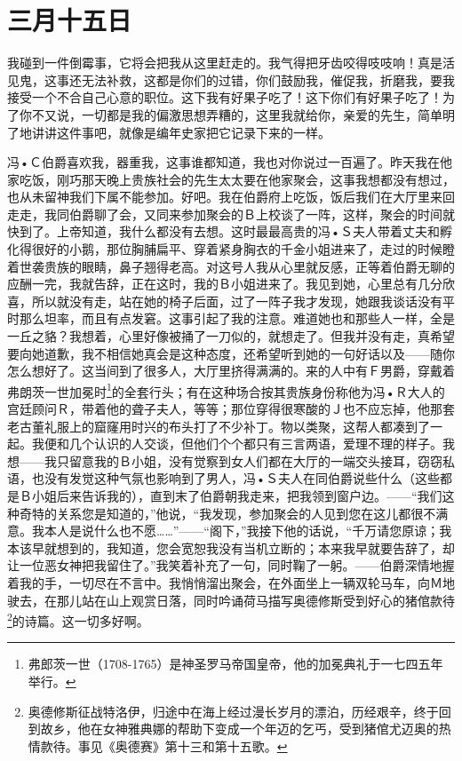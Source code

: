 \documentclass[12pt,oneside]{book}
\begin{document}
\chapter{三月十五日}
\label{sec-3-9}
我碰到一件倒霉事，它将会把我从这里赶走的。我气得把牙齿咬得吱吱响！真是活见鬼，这事还无法补救，这都是你们的过错，你们鼓励我，催促我，折磨我，要我接受一个不合自己心意的职位。这下我有好果子吃了！这下你们有好果子吃了！为了你不又说，一切都是我的偏激思想弄糟的，这里我就给你，亲爱的先生，简单明了地讲讲这件事吧，就像是编年史家把它记录下来的一样。

冯•Ｃ伯爵喜欢我，器重我，这事谁都知道，我也对你说过一百遍了。昨天我在他家吃饭，刚巧那天晚上贵族社会的先生太太要在他家聚会，这事我想都没有想过，也从未留神我们下属不能参加。好吧。我在伯爵府上吃饭，饭后我们在大厅里来回走走，我同伯爵聊了会，又同来参加聚会的Ｂ上校谈了一阵，这样，聚会的时间就快到了。上帝知道，我什么都没有去想。这时最最高贵的冯•Ｓ夫人带着丈夫和孵化得很好的小鹅，那位胸脯扁平、穿着紧身胸衣的千金小姐进来了，走过的时候瞪着世袭贵族的眼睛，鼻子翘得老高。对这号人我从心里就反感，正等着伯爵无聊的应酬一完，我就告辞，正在这时，我的Ｂ小姐进来了。我见到她，心里总有几分欣喜，所以就没有走，站在她的椅子后面，过了一阵子我才发现，她跟我谈话没有平时那么坦率，而且有点发窘。这事引起了我的注意。难道她也和那些人一样，全是一丘之貉？我想着，心里好像被捅了一刀似的，就想走了。但我并没有走，真希望要向她道歉，我不相信她真会是这种态度，还希望听到她的一句好话以及——随你怎么想好了。这当间到了很多人，大厅里挤得满满的。来的人中有Ｆ男爵，穿戴着弗朗茨一世加冕时\footnote{弗郎茨一世（1708-1765）是神圣罗马帝国皇帝，他的加冕典礼于一七四五年举行。}的全套行头；有在这种场合按其贵族身份称他为冯•Ｒ大人的宫廷顾问Ｒ，带着他的聋子夫人，等等；那位穿得很寒酸的Ｊ也不应忘掉，他那套老古董礼服上的窟窿用时兴的布头打了不少补丁。物以类聚，这帮人都凑到了一起。我便和几个认识的人交谈，但他们个个都只有三言两语，爱理不理的样子。我想——我只留意我的Ｂ小姐，没有觉察到女人们都在大厅的一端交头接耳，窃窃私语，也没有发觉这种气氛也影响到了男人，冯•Ｓ夫人在同伯爵说些什么（这些都是Ｂ小姐后来告诉我的），直到末了伯爵朝我走来，把我领到窗户边。——“我们这种奇特的关系您是知道的，”他说，“我发现，参加聚会的人见到您在这儿都很不满意。我本人是说什么也不愿……”——“阁下，”我接下他的话说，“千万请您原谅；我本该早就想到的，我知道，您会宽恕我没有当机立断的；本来我早就要告辞了，却让一位恶女神把我留住了。”我笑着补充了一句，同时鞠了一躬。——伯爵深情地握着我的手，一切尽在不言中。我悄悄溜出聚会，在外面坐上一辆双轮马车，向Ｍ地驶去，在那儿站在山上观赏日落，同时吟诵荷马描写奥德修斯受到好心的猪倌款待\footnote{奥德修斯征战特洛伊，归途中在海上经过漫长岁月的漂泊，历经艰辛，终于回到故乡，他在女神雅典娜的帮助下变成一个年迈的乞丐，受到猪倌尤迈奥的热情款待。事见《奥德赛》第十三和第十五歌。}的诗篇。这一切多好啊。
\end{document}
